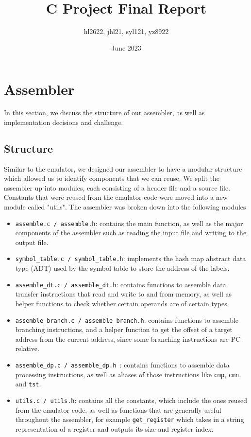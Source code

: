 \documentclass{article}
\title{C Project Final Report}
\author{hl2622, jhl21, syl121, yz8922}
\date{June 2023}
\begin{document}
    \maketitle
    \section{Assembler}
        In this section, we discuss the structure of our assembler, as well as implementation decisions and challenge.
    
        \begin{adjustwidth}{2em}{0pt}
        
        \subsection{Structure}
        
            Similar to the emulator, we designed our assembler to have a modular structure which allowed us to identify components that we can reuse. We split the assembler up into modules, each consisting of a header file and a source file. Constants that were reused from the emulator code were moved into a new module called "utils". The assembler was broken down into the following modules
        
            \begin{itemize}
                \item \texttt{assemble.c / assemble.h}: contains the main function, as well as the major components of the assembler such as reading the input file and writing to the output file. 
                \item  \texttt{symbol\_table.c / symbol\_table.h}: implements the hash map abstract data type (ADT) used by the symbol table to store the address of the labels.
                \item \texttt{assemble\_dt.c / assemble\_dt.h}: contains functions to assemble data transfer instructions that read and write to and from memory, as well as helper functions to check whether certain operands are of certain types.
                \item \texttt{assemble\_branch.c / assemble\_branch.h}: contains functions to assemble branching instructions, and a helper function to get the offset of a target address from the current address, since some branching instructions are PC-relative. 
                \item \texttt{assemble\_dp.c / assemble\_dp.h }: contains functions to assemble data processing instructions, as well as aliases of those instructions like \texttt{cmp}, \texttt{cmn}, and \texttt{tst}.
                \item \texttt{utils.c / utils.h}: contains all the constants, which include the ones reused from the emulator code, as well as functions that are generally useful throughout the assembler, for example \texttt{get\_register} which takes in a string representation of a register and outputs its size and register index.
            \end{itemize}
    

\end{adjustwidth}
\end{document}
